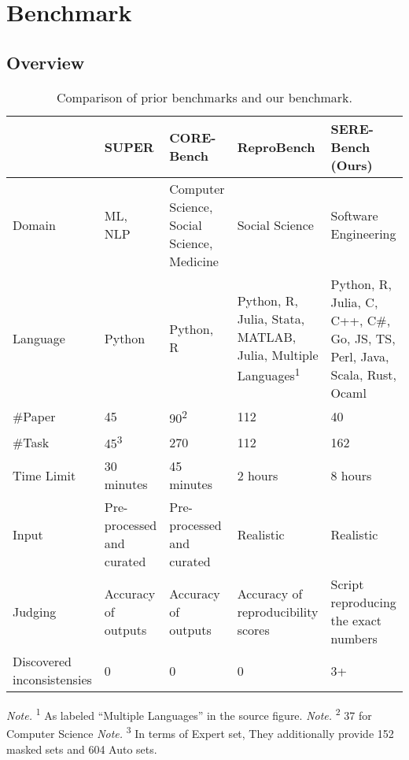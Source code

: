 \section{Benchmark}
\label{s:benchmark}

\subsection{Overview} 

\begin{table}[ht]
\caption{Comparison of prior benchmarks and our benchmark.}
\centering
\renewcommand{\arraystretch}{1.25}
\begin{tabularx}{\linewidth}{lXXXX}
\toprule
 & \textbf{SUPER} & \textbf{CORE-Bench} & \textbf{ReproBench} & \textbf{SERE-Bench (Ours)} \\
\midrule
Domain & ML, NLP & Computer Science, Social Science, Medicine & Social Science & Software Engineering \\
Language & Python & Python, R & Python, R, Julia, Stata, MATLAB, Julia, Multiple Languages\textsuperscript{1} & Python, R, Julia, C, C++, C\#, Go, JS, TS, Perl, Java, Scala, Rust, Ocaml \\

\#Paper
& 45 & 90\textsuperscript{2} & 112 & 40 \\

\#Task
& 45\textsuperscript{3} & 270 & 112 & 162 \\

Time Limit
& 30 minutes & 45 minutes & 2 hours & 8 hours \\

Input & Pre-processed and curated & Pre-processed and curated & Realistic & Realistic \\

Judging
& Accuracy of outputs & Accuracy of outputs & Accuracy of reproducibility scores & Script reproducing the exact numbers \\

Discovered inconsistensies & 0 & 0 & 0 & 3+ \\
\bottomrule
\end{tabularx}

\vspace{2mm}
\footnotesize\emph{Note.} \textsuperscript{1} As labeled “Multiple Languages” in the source figure.
\footnotesize\emph{Note.} \textsuperscript{2} 37 for Computer Science
\footnotesize\emph{Note.} \textsuperscript{3} In terms of Expert set, They additionally provide 152 masked sets and 604 Auto sets.
\end{table}


